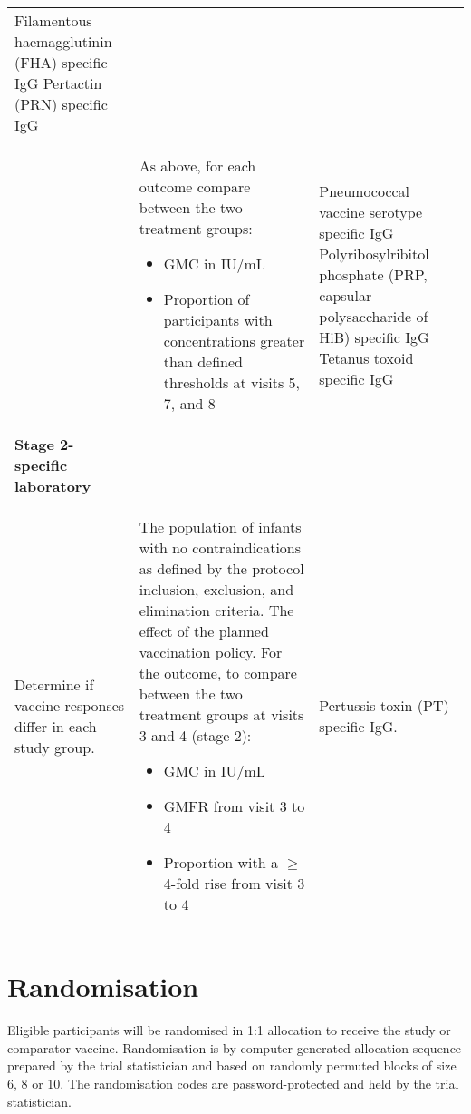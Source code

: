 \documentclass{bmcart}
\begin{document}
\begin{table}[h!]
\begin{tabular}{p{4cm}p{4cm}p{4cm}}
		Filamentous haemagglutinin (FHA) specific IgG\newline 
		Pertactin (PRN) specific IgG
		\\
		& 		
		As above, for each outcome compare between the two treatment groups: 
		\begin{itemize}
			\item GMC in IU/mL
			\item Proportion of participants with concentrations greater than defined thresholds at visits 5, 7, and 8
		\end{itemize} &
		Pneumococcal vaccine serotype specific IgG\newline 
		Polyribosylribitol phosphate (PRP, capsular polysaccharide of HiB) specific IgG\newline 
		Tetanus toxoid specific IgG
		\\
		\textbf{Stage 2-specific laboratory} & &  \\
		Determine if vaccine responses differ in each study group. &
		The population of infants with no contraindications as defined by the protocol inclusion, exclusion, and elimination criteria. \newline 
		The effect of the planned vaccination policy.\newline
		For the outcome, to compare between the two treatment groups at visits 3 and 4 (stage 2):
		\begin{itemize} 
			\item GMC in IU/mL
			\item GMFR from visit 3 to 4
			\item Proportion with a $\geq$4-fold rise from visit 3 to 4
		\end{itemize} &
		Pertussis toxin (PT) specific IgG.
		\\
		\hline
		\hline
	\end{tabular}
\end{table}


\section*{Randomisation}

Eligible participants will be randomised in 1:1 allocation to receive the study or comparator vaccine.
Randomisation is by computer-generated allocation sequence prepared by the trial statistician and based on randomly permuted blocks of size 6, 8 or 10.
The randomisation codes are password-protected and held by the trial statistician.
\end{document}
